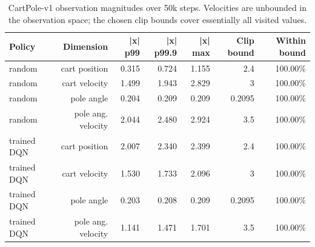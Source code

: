 \begin{table}[t]
\centering\small
\caption{CartPole-v1 observation magnitudes over 50k steps. Velocities are unbounded in the observation space; the chosen clip bounds cover essentially all visited values.}
\label{tab:t1_obs_ranges}
\begin{tabular}{lrrrrrr}
\toprule
Policy & Dimension & |x| p99 & |x| p99.9 & |x| max & Clip bound & Within bound \\
\midrule
random & cart position & 0.315 & 0.724 & 1.155 & 2.4 & 100.00\% \\
random & cart velocity & 1.499 & 1.943 & 2.829 & 3 & 100.00\% \\
random & pole angle & 0.204 & 0.209 & 0.209 & 0.2095 & 100.00\% \\
random & pole ang. velocity & 2.044 & 2.480 & 2.924 & 3.5 & 100.00\% \\
trained DQN & cart position & 2.007 & 2.340 & 2.399 & 2.4 & 100.00\% \\
trained DQN & cart velocity & 1.530 & 1.733 & 2.096 & 3 & 100.00\% \\
trained DQN & pole angle & 0.203 & 0.208 & 0.209 & 0.2095 & 100.00\% \\
trained DQN & pole ang. velocity & 1.141 & 1.471 & 1.701 & 3.5 & 100.00\% \\
\bottomrule
\end{tabular}
\end{table}
